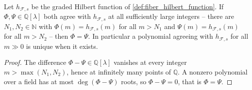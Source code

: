 \begin{lemma}
  \label{lem:hilbertPolynomial_unique}
  Let \(h_{\mathcal{F},s}\) be the graded Hilbert function of
  \cref{def:fiber_hilbert_function}. If \(\Phi, \Psi \in \mathbb{Q}[\lambda]\)
  both agree with \(h_{\mathcal{F},s}\) at all sufficiently large integers --
  there are \(N_1, N_2 \in \mathbb{N}\) with
  \(\Phi(m) = h_{\mathcal{F},s}(m)\) for all \(m > N_1\) and
  \(\Psi(m) = h_{\mathcal{F},s}(m)\) for all \(m > N_2\) -- then
  \(\Phi = \Psi\). In particular a polynomial agreeing with
  \(h_{\mathcal{F},s}\) for all \(m \gg 0\) is unique when it exists.
\end{lemma}

\begin{proof}
  \leanok
  The difference \(\Phi - \Psi \in \mathbb{Q}[\lambda]\) vanishes at every
  integer \(m > \max(N_1, N_2)\), hence at infinitely many points of
  \(\mathbb{Q}\). A nonzero polynomial over a field has at most
  \(\deg(\Phi - \Psi)\) roots, so \(\Phi - \Psi = 0\), that is
  \(\Phi = \Psi\).
\end{proof}

